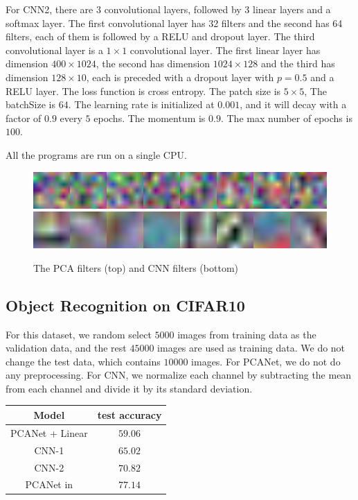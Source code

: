 \documentclass{article} %
\begin{document}
For CNN2, there are 3 convolutional layers, followed by 3 linear layers and a softmax layer. The first convolutional layer has 32 filters and the second has 64 filters, each of them is followed by a RELU and dropout layer. The third convolutional layer is a $1\times 1$ convolutional layer. The first linear layer has dimension $400 \times 1024$, the second has dimension $1024 \times 128$ and the third has dimension $128 \times 10$, each is preceded with a dropout layer with $p=0.5$ and a RELU layer. The loss function is cross entropy. The patch size is $5 \times 5$, The batchSize is $64$. The learning rate is initialized at $0.001$, and it will decay with a factor of $0.9$ every $5$ epochs. The momentum is $0.9$. The max number of epochs is $100$. 

All the programs are run on a single CPU.

\begin{figure}[h]
	\begin{center}
		\includegraphics[scale=1.7,width=15cm]{PCA_filters.png} \label{Fig: PCA}
		\includegraphics[scale=1.7,width=15cm]{CNN_filters.png} \label{Fig: CNN1}
	\end{center}
	\caption{The PCA filters (top) and CNN filters (bottom)}\label{Fig: filters}
\end{figure}


\subsection{Object Recognition on CIFAR10}
For this dataset, we random select $5000$ images from training data as the validation data, and the rest $45000$ images are used as training data. We do not change the test data, which contains $10000$ images. For PCANet, we do not do any preprocessing. For CNN, we normalize each channel by subtracting the mean from each channel and divide it by its standard deviation. 

\begin{table}[h]
	\begin{center}
		\begin{tabular}{|c|c|}
		\hline
		Model & test accuracy  \\
		\hline
		PCANet + Linear & $59.06$ \\
		\hline
		CNN-1 & $65.02$ \\ 	
		\hline
		CNN-2 & $70.82$ \\ 	
		\hline
		PCANet in \cite{chan2015pcanet} & $77.14$\\
			\hline
		\end{tabular}
	\end{center}
\end{table}
\end{document}
